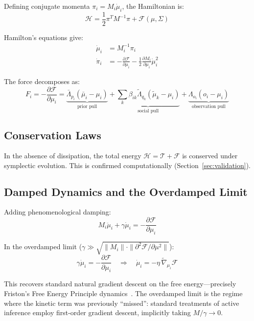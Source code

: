 \documentclass[11pt]{article}
\begin{document}
Defining conjugate momenta $\pi_i = M_i\dot{\mu}_i$, the Hamiltonian is:
\begin{equation}
\mathcal{H} = \frac{1}{2}\pi^T M^{-1}\pi + \mathcal{F}(\mu, \Sigma)
\label{eq:hamiltonian}
\end{equation}

Hamilton's equations give:
\begin{align}
\dot{\mu}_i &= M_i^{-1}\pi_i \\
\dot{\pi}_i &= -\frac{\partial\mathcal{F}}{\partial\mu_i} - \frac{1}{2}\frac{\partial M_i}{\partial\mu_i}\dot{\mu}_i^2
\end{align}

The force decomposes as:
\begin{equation}
F_i = -\frac{\partial\mathcal{F}}{\partial\mu_i} = \underbrace{\bar{\Lambda}_{p_i}(\bar{\mu}_i - \mu_i)}_{\text{prior pull}} + \underbrace{\sum_k\beta_{ik}\tilde{\Lambda}_{q_k}(\tilde{\mu}_k - \mu_i)}_{\text{social pull}} + \underbrace{\Lambda_{o_i}(o_i - \mu_i)}_{\text{observation pull}}
\end{equation}

\subsection{Conservation Laws}

In the absence of dissipation, the total energy $\mathcal{H} = \mathcal{T} + \mathcal{F}$ is conserved under symplectic evolution. This is confirmed computationally (Section~\ref{sec:validation}).

\subsection{Damped Dynamics and the Overdamped Limit}

Adding phenomenological damping:
\begin{equation}
M_i\ddot{\mu}_i + \gamma\dot{\mu}_i = -\frac{\partial\mathcal{F}}{\partial\mu_i}
\label{eq:damped}
\end{equation}

In the overdamped limit ($\gamma \gg \sqrt{\|M_i\| \cdot \|\partial^2\mathcal{F}/\partial\mu^2\|}$):
\begin{equation}
\gamma\dot{\mu}_i = -\frac{\partial\mathcal{F}}{\partial\mu_i} \quad \Longrightarrow \quad \dot{\mu}_i = -\eta\,\tilde{\nabla}_{\mu_i}\mathcal{F}
\end{equation}

This recovers standard natural gradient descent on the free energy---precisely Friston's Free Energy Principle dynamics~\cite{Friston2010}. The overdamped limit is the regime where the kinetic term was previously ``missed'': standard treatments of active inference employ first-order gradient descent, implicitly taking $M/\gamma \to 0$.
\end{document}

